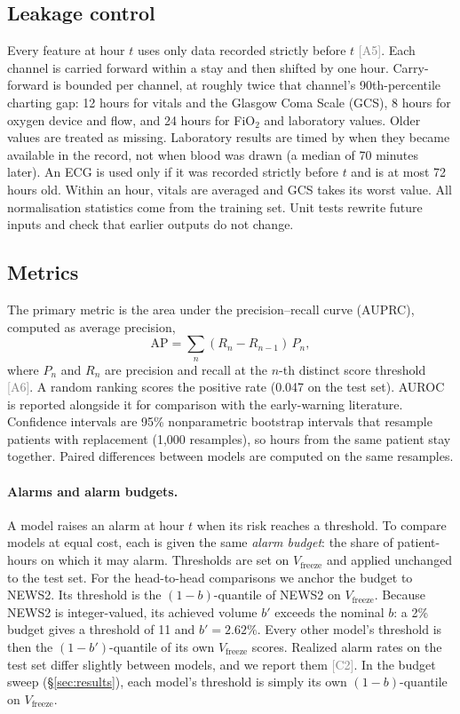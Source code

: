 \documentclass[11pt]{article}
\newcommand{\ev}[1]{\textcolor{gray}{\scriptsize[#1]}}   %
\begin{document}
\subsection{Leakage control}
Every feature at hour $t$ uses only data recorded strictly before $t$
\ev{A5}. Each channel is carried forward within a stay and then shifted by one
hour. Carry-forward is bounded per channel, at roughly twice that channel's
90th-percentile charting gap: 12 hours for vitals and the Glasgow Coma Scale
(GCS), 8 hours for oxygen device and flow, and 24 hours for FiO$_2$ and
laboratory values. Older values are treated as missing. Laboratory results
are timed by when they became available in the record, not when blood was
drawn (a median of 70 minutes later). An ECG is used only if it was recorded
strictly before $t$ and is at most 72 hours old. Within an hour, vitals are
averaged and GCS takes its worst value. All normalisation statistics come from
the training set. Unit tests rewrite future inputs and check that earlier
outputs do not change.

\subsection{Metrics}
The primary metric is the area under the precision--recall curve (AUPRC),
computed as average precision,
\begin{equation}
  \mathrm{AP} = \sum_{n} (R_n - R_{n-1})\, P_n ,
\end{equation}
where $P_n$ and $R_n$ are precision and recall at the $n$-th distinct score
threshold \ev{A6}. A random ranking scores the positive rate (0.047 on the
test set). AUROC is reported alongside it for comparison with the
early-warning literature. Confidence intervals are 95\% nonparametric
bootstrap intervals that resample patients with replacement (1{,}000
resamples), so hours from the same patient stay together. Paired differences
between models are computed on the same resamples.

\paragraph{Alarms and alarm budgets.}
A model raises an alarm at hour $t$ when its risk reaches a threshold. To
compare models at equal cost, each is given the same \emph{alarm budget}: the
share of patient-hours on which it may alarm. Thresholds are set on
$V_{\text{freeze}}$ and applied unchanged to the test set. For the head-to-head
comparisons we anchor the budget to NEWS2. Its threshold is the
$(1-b)$-quantile of NEWS2 on $V_{\text{freeze}}$. Because NEWS2 is
integer-valued, its achieved volume $b'$ exceeds the nominal $b$: a 2\%
budget gives a threshold of 11 and $b' = 2.62\%$. Every other model's threshold
is then the $(1-b')$-quantile of its own $V_{\text{freeze}}$ scores. Realized
alarm rates on the test set differ slightly between models, and we report them
\ev{C2}. In the budget sweep (\S\ref{sec:results}), each model's threshold is
simply its own $(1-b)$-quantile on $V_{\text{freeze}}$.
\end{document}
